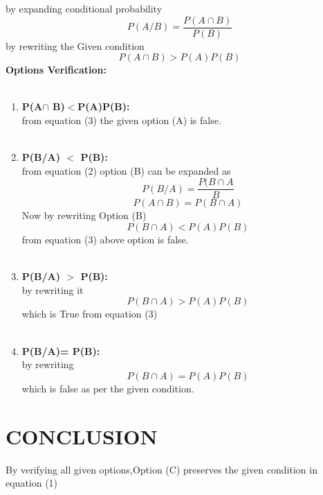\documentclass[journal,12pt,twocolumn]{IEEEtran}
\begin{document}
by expanding conditional probability
\begin{equation}
    P(A/B)=\frac{P(A\cap B)}{P(B)}
\end{equation}
by rewriting the Given condition
\begin{equation}
    P(A\cap B)>P(A)P(B)
\end{equation}
\textbf{Options Verification:}\\ \\
\begin{enumerate}[label=\textbf{\Alph*)}]
    
      \item  \textbf{P(A$\cap$ B)$<$P(A)P(B):}\\ 
      from equation (3) the given option (A) is false.\\ \\
      \item \textbf{ P(B/A) $<$ P(B): }\\
      from equation (2) option (B) can be expanded as
      \begin{equation}
            P(B/A)=\frac{P(B\cap A}{B}
       \end{equation}
       \begin{equation}
    P(A\cap B)=P(B\cap A)
\end{equation}
       Now by rewriting Option (B)\\
       \begin{equation}
            P(B\cap A) < P(A)P(B)
       \end{equation}
       from equation (3) above option is false.\\ \\
       \item \textbf{ P(B/A) $>$ P(B): }\\
       by rewriting it \\
       \begin{equation}
            P(B\cap A)>P(A)P(B)
       \end{equation}
       which is True from equation (3)\\ \\
       \item \textbf{ P(B/A)= P(B): }\\
       by rewriting \\
       \begin{equation}
            P(B\cap A)=P(A)P(B)
       \end{equation}
       which is false as per the given condition.
\end{enumerate}
\section{\textbf{CONCLUSION}}
By verifying all given options,Option (C) preserves the given condition in equation (1)
\end{document}
